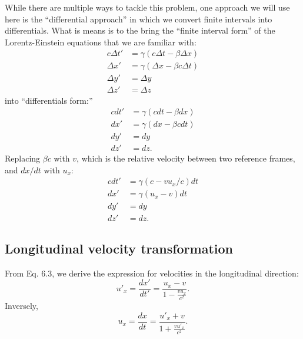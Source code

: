 \documentclass[a4paper,11pt]{article}
\numberwithin{equation}{section}
\begin{document}
 \noindent While there are multiple ways to tackle this problem, one approach we will use here is the ``differential approach'' in which we convert finite intervals into differentials. What is means is to the bring the ``finite interval form'' of the Lorentz-Einstein equations that we are familiar with:
 \begin{equation}
 \begin{split}
 c\Delta t' &= \gamma(c\Delta t - \beta \Delta x) \\
 \Delta x' &= \gamma(\Delta x - \beta c \Delta t)\\
 \Delta y' &= \Delta y \\
 \Delta z' &= \Delta z
 \end{split}
 \end{equation}
 into ``differentials form:''
 \begin{equation}
 \begin{split}
 cdt' &= \gamma(cdt - \beta dx) \\
 dx' &= \gamma(dx - \beta c dt)\\
 dy' &= dy \\
 dz' &= dz.
 \end{split}
 \end{equation}
 \noindent Replacing $\beta c$ with $v$, which is the relative velocity between two reference frames, and $dx/dt$ with $u_x$:
 \begin{equation}
 \begin{split}
 cdt' &= \gamma\left( c - vu_x/c\right) dt \\
 dx' &= \gamma(u_x - v)dt\\
 dy' &= dy \\
 dz' &= dz.
 \end{split}
 \end{equation}
 
 \subsection{Longitudinal velocity transformation}
 From Eq. 6.3, we derive the expression for velocities in the longitudinal direction:
 \begin{equation}
 {u'}_x=\frac{dx'}{dt'}=\frac{u_x-v}{1-\frac{vu_x}{c^2}}.
 \end{equation}
 Inversely, 
 \begin{equation}
 {u}_x=\frac{dx}{dt}=\frac{{u'}_x+v}{1+\frac{v{u'}_x}{c^2}}.
 \end{equation}
\end{document}
